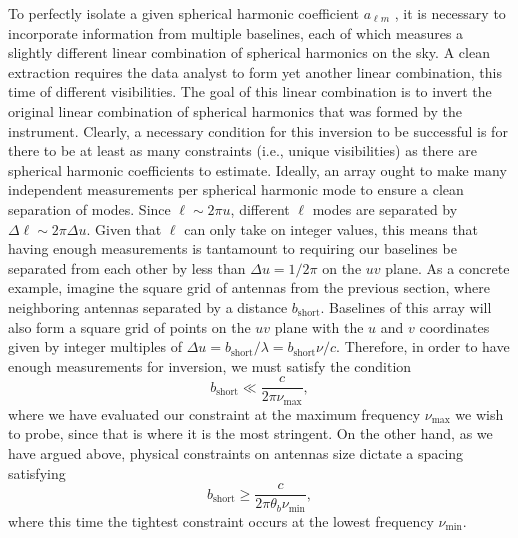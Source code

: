 \documentclass[twocolumn,apj,numberedappendix]{emulateapj}
\newcommand{\acl}[1]{{\color{red} \textbf{[ACL:  #1]}}}
\begin{document}
To perfectly isolate a given spherical harmonic coefficient $a_{\ell m}$ , it is necessary to incorporate information from multiple baselines, each of which measures a slightly different linear combination of spherical harmonics on the sky. A clean extraction requires the data analyst to form yet another linear combination, this time of different visibilities. The goal of this linear combination is to invert the original linear combination of spherical harmonics that was formed by the instrument. Clearly, a necessary condition for this inversion to be successful is for there to be at least as many constraints (i.e., unique visibilities) as there are spherical harmonic coefficients to estimate. Ideally, an array ought to make many independent measurements per spherical harmonic mode to ensure a clean separation of modes.  Since $\ell \sim 2 \pi u$, different $\ell$ modes are separated by $\Delta \ell \sim 2 \pi \Delta u$.  Given that $\ell$ can only take on integer values, this means that having enough measurements is tantamount to requiring our baselines be separated from each other by less than $\Delta u = 1/ 2 \pi$ on the $uv$ plane.  As a concrete example, imagine the square grid of antennas from the previous section, where neighboring antennas separated by a distance $b_\textrm{short}$.  Baselines of this array will also form a square grid of points on the $uv$ plane with the $u$ and $v$ coordinates given by integer multiples of $\Delta u = b_\textrm{short} / \lambda = b_\textrm{short} \nu / c$.  Therefore, in order to have enough measurements for inversion, we must satisfy the condition
\begin{equation}
\label{eq:WantAll}
b_\textrm{short} \ll \frac{c}{2 \pi \nu_\textrm{max}},
\end{equation}
where we have evaluated our constraint at the maximum frequency $\nu_\textrm{max}$ we wish to probe, since that is where it is the most stringent.  On the other hand, as we have argued above, physical constraints on antennas size dictate a spacing satisfying
\begin{equation}
\label{eq:AntSize}
b_\textrm{short} \ge \frac{c}{2 \pi \theta_b \nu_\textrm{min}},
\end{equation}
where this time the tightest constraint occurs at the lowest frequency $\nu_\textrm{min}$.

\end{document}
